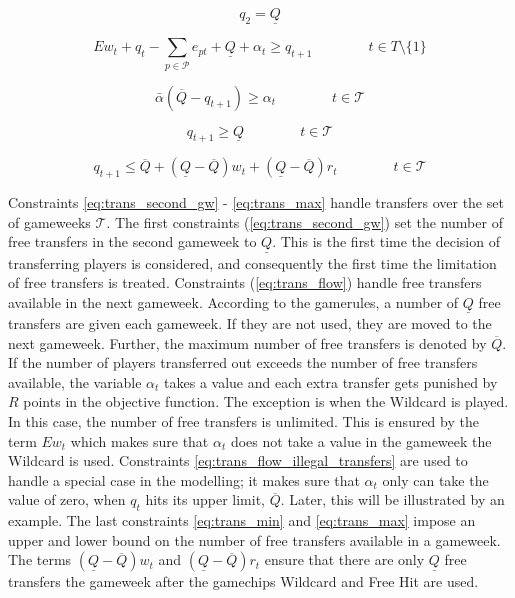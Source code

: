 \begin{equation} \label{eq:trans_second_gw}
    q_{2} = \underline{Q}
\end{equation}

\begin{equation} \label{eq:trans_flow}
   E w_{t} + q_{t}-\sum_{p \in \mathcal{P}}e_{pt} + \underline{Q} + \alpha_{t} \geq q_{t+1} \qquad\qquad t \in T\setminus\{1\}
\end{equation}


\begin{equation} \label{eq:trans_flow_illegal_transfers}
    \bar{\alpha}(\overline{Q}-q_{t+1}) \geq \alpha_{t} \qquad\qquad t \in \mathcal{T}
\end{equation}

\begin{equation} \label{eq:trans_min}
    q_{t+1} \geq \underline{Q} \qquad\qquad t \in \mathcal{T}
\end{equation}

\begin{equation} \label{eq:trans_max}
    q_{t+1} \leq \overline{Q} + (\underline{Q}-\overline{Q})w_{t} + (\underline{Q}-\overline{Q})r_{t} \qquad\qquad t \in \mathcal{T}
\end{equation}

\newpar

Constraints \eqref{eq:trans_second_gw} - \eqref{eq:trans_max} handle transfers over the set of gameweeks $\mathcal{T}$. The first constraints (\ref{eq:trans_second_gw}) set the number of free transfers in the second gameweek to $\underline{Q}$. This is the first time the decision of transferring players is considered, and consequently the first time the limitation of free transfers is treated. Constraints (\ref{eq:trans_flow}) handle free transfers available in the next gameweek. According to the gamerules, a number of $\underline{Q}$ free transfers are given each gameweek. If they are not used, they are moved to the next gameweek. Further, the maximum number of free transfers is denoted by $\overline{Q}$. If the number of players transferred out exceeds the number of free transfers available, the variable $\alpha_{t}$ takes a value and each extra transfer gets punished by $R$ points in the objective function. The exception is when the Wildcard is played. In this case, the number of free transfers is unlimited. This is ensured by the term $E w_{t}$ which makes sure that $\alpha_{t}$ does not take a value in the gameweek the Wildcard is used. Constraints \eqref{eq:trans_flow_illegal_transfers} are used to handle a special case in the modelling; it makes sure that $\alpha_{t}$ only can take the value of zero, when $q_{t}$ hits its upper limit, $\overline{Q}$. Later, this will be illustrated by an example. The last constraints \eqref{eq:trans_min} and \eqref{eq:trans_max} impose an upper and lower bound on the number of free transfers available in a gameweek. The terms $(\underline{Q}-\overline{Q})w_{t}$ and $(\underline{Q}-\overline{Q})r_{t}$ ensure that there are only $\underline{Q}$ free transfers the gameweek after the gamechips Wildcard and Free Hit are used. 

